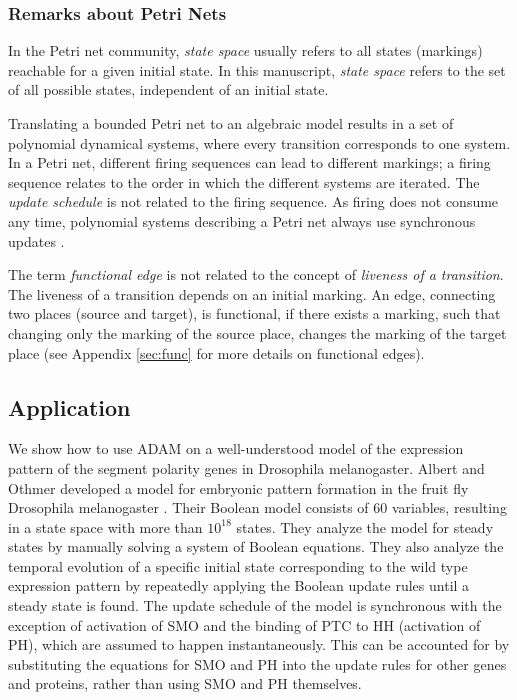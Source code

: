 \documentclass[10pt]{bmc_article}
\newenvironment{bmcformat}{\begin{raggedright}\baselineskip20pt\sloppy\setboolean{publ}{false}}{\end{raggedright}\baselineskip20pt\sloppy}
\begin{document}
\begin{bmcformat}
\subsubsection*{Remarks about Petri Nets}
In the Petri net community, {\it state space} usually refers to all states (markings) reachable for a given initial state. In this manuscript, {\it state space} refers to the set of all possible states, independent of an initial state.

Translating a bounded Petri net to an algebraic model results in a set of polynomial dynamical systems, where every transition corresponds to one system. In a Petri net, different firing sequences can lead to different markings; a firing sequence relates to the order in which the different systems are iterated. The {\it update schedule} is not related to the firing sequence. As firing does not consume any time, polynomial systems describing a Petri net always use synchronous updates \cite{Heiner:2008}. 

The term {\it functional edge} is not related to the concept of {\it liveness of a transition}. The liveness of a transition depends on an initial marking. An edge, connecting two places (source and target), is functional, if there exists a marking, such that changing only the marking of the source place, changes the marking of the target place (see Appendix \ref{sec:func} for more details on functional edges). 

\subsection*{Application} \label{benchmarks}
We show how to use ADAM on a well-understood model of the expression
pattern of the segment polarity genes in Drosophila melanogaster. Albert and Othmer developed a model for embryonic pattern formation in the fruit fly Drosophila melanogaster \cite{AO}. Their Boolean
model consists of 60 variables, resulting in a state
space with more than $10^{18}$ states. They analyze the model for steady states by manually solving a system of Boolean equations. They also analyze the temporal evolution of a specific initial state corresponding to the wild type expression pattern by repeatedly applying the Boolean update rules until a steady state is found. The update schedule of the model is synchronous  with the exception of activation of SMO and the binding of PTC to HH (activation of PH), which are assumed to happen instantaneously. This can be accounted for by substituting the equations for SMO and PH into the update rules for other genes and proteins, rather than using SMO and PH themselves.


\end{bmcformat}
\end{document}
